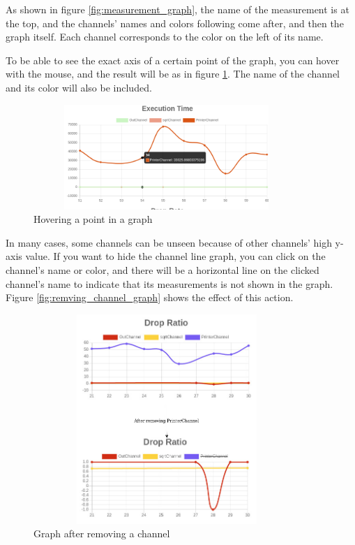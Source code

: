 As shown in figure \ref{fig:measurement_graph}, the name of the measurement is at the top, and the channels'
names and colors following come after, and then the graph itself. Each channel corresponds to the color
on the left of its name.

To be able to see the exact axis of a certain point of the graph, you can hover with the mouse, 
and the result will be as in figure \ref{fig:hover_graph}. The name of the channel and its color
will also be included. 
\newline
\begin{figure}[H]
	\centering
	\includegraphics[width=0.9\textwidth,height=150px]{images/hover_graph.png}
	\caption{Hovering a point in a graph}
	\label{fig:hover_graph}
\end{figure}

In many cases, some channels can be unseen because of other channels' high y-axis value. If you want
to hide the channel line graph, you can click on the channel's name or color, and there will be 
a horizontal line on the clicked channel's name to indicate that its measurements is not shown
in the graph. Figure 
\ref{fig:remving_channel_graph} shows the effect of this action.
\newline
\begin{figure}[H]
	\centering
	\includegraphics[width=0.9\textwidth,height=300px]{images/removnig_channel_graph.jpg}
	\caption{Graph after removing a channel}
	\label{fig:removing_channel_graph}
\end{figure}

